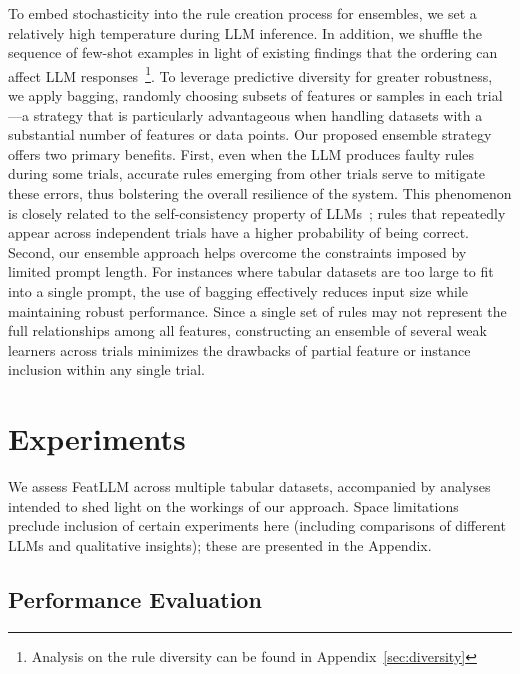 To embed stochasticity into the rule creation process for ensembles, we set a relatively high temperature during LLM inference. In addition, we shuffle the sequence of few-shot examples in light of existing findings that the ordering can affect LLM responses~\cite{lu2022fantastically}\footnote{Analysis on the rule diversity can be found in Appendix~\ref{sec:diversity}}. To leverage predictive diversity for greater robustness, we apply bagging, randomly choosing subsets of features or samples in each trial—a strategy that is particularly advantageous when handling datasets with a substantial number of features or data points. Our proposed ensemble strategy offers two primary benefits. First, even when the LLM produces faulty rules during some trials, accurate rules emerging from other trials serve to mitigate these errors, thus bolstering the overall resilience of the system. This phenomenon is closely related to the self-consistency property of LLMs~\cite{wang2022self}; rules that repeatedly appear across independent trials have a higher probability of being correct. Second, our ensemble approach helps overcome the constraints imposed by limited prompt length. For instances where tabular datasets are too large to fit into a single prompt, the use of bagging effectively reduces input size while maintaining robust performance. Since a single set of rules may not represent the full relationships among all features, constructing an ensemble of several weak learners across trials minimizes the drawbacks of partial feature or instance inclusion within any single trial.

\section{Experiments}
We assess \textsf{FeatLLM} across multiple tabular datasets, accompanied by analyses intended to shed light on the workings of our approach. Space limitations preclude inclusion of certain experiments here (including comparisons of different LLMs and qualitative insights); these are presented in the Appendix.

\subsection{Performance Evaluation}
